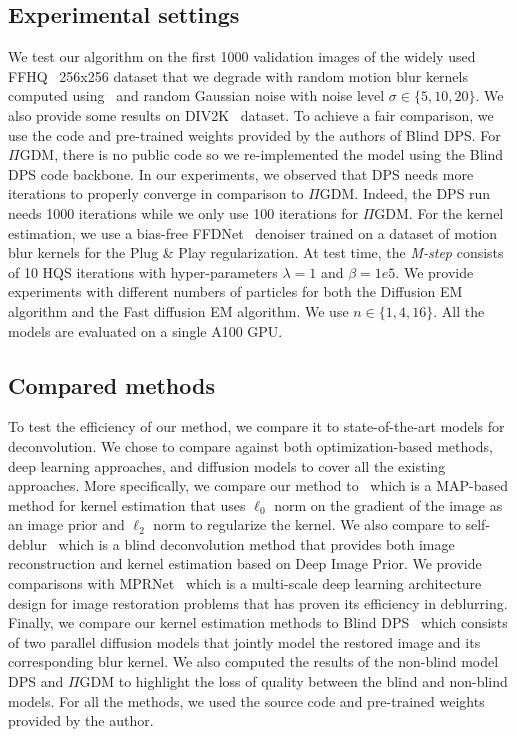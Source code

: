 \documentclass[10pt,twocolumn,letterpaper]{article}
\begin{document}
\subsection{Experimental settings}
%
We test our algorithm on the first 1000 validation images of the widely used FFHQ~\cite{ffhqdataset} 256x256 dataset that we degrade with random motion blur kernels computed using~\cite{camera_shake} and random Gaussian noise with noise level $\sigma\in \{5, 10, 20\}$. We also provide some results on DIV2K~\cite{Agustsson_2017_CVPR_Workshops} dataset.
To achieve a fair comparison, we use the code and pre-trained weights provided by the authors of Blind DPS. For $\Pi$GDM, there is no public code so we re-implemented the model using the Blind DPS code backbone. In our experiments, we observed that DPS needs more iterations to properly converge in comparison to $\Pi$GDM. Indeed, the DPS run needs 1000 iterations while we only use 100 iterations for $\Pi$GDM.
%
For the kernel estimation, we use a bias-free FFDNet~\cite{ffdnet} denoiser trained on a dataset of motion blur kernels for the Plug \& Play regularization. At test time, the \textit{M-step} consists of 10 HQS iterations with hyper-parameters $\lambda=1$ and $\beta=1e5$. 
We provide experiments with different numbers of particles for both the Diffusion EM algorithm and the Fast diffusion EM algorithm. We use $n \in \{1, 4, 16\}$. 
%
All the models are evaluated on a single A100 GPU.
%
%

\subsection{Compared methods}

To test the efficiency of our method, we compare it to state-of-the-art models for deconvolution. We chose to compare against both optimization-based methods, deep learning approaches, and diffusion models to cover all the existing approaches. 
More specifically, we compare our method to~\cite{anger_blind_2019} which is a MAP-based method for kernel estimation that uses $\ell_0$ norm on the gradient of the image as an image prior and $\ell_2$ norm to regularize the kernel. 
%
We also compare to self-deblur~\cite{ren_neural_2020} which is a blind deconvolution method that provides both image reconstruction and kernel estimation based on Deep Image Prior. 
%
We provide comparisons with MPRNet~\cite{Zamir_2021_CVPR} which is a multi-scale deep learning architecture design for image restoration problems that has proven its efficiency in deblurring. 
%
Finally, we compare our kernel estimation methods to Blind DPS~\cite{chung_parallel_2023} which consists of two parallel diffusion models that jointly model the restored image and its corresponding blur kernel. 
%
We also computed the results of the non-blind model DPS and $\Pi$GDM to highlight the loss of quality between the blind and non-blind models.
%
For all the methods, we used the source code and pre-trained weights provided by the author.
%
%
\end{document}

